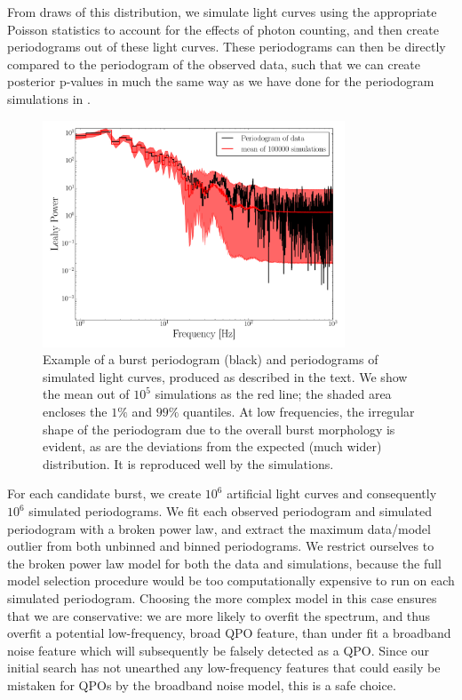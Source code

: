 \documentclass[numberedappendix]{emulateapj}
\begin{document}
From draws of this distribution, we simulate light curves using the appropriate Poisson statistics to account for the effects of photon counting, and then create periodograms out of these light curves. These periodograms can then be directly compared to the periodogram of the observed data, such that we can create posterior p-values in much the same way as we have done for the periodogram simulations in \citep{huppenkothen2013}. 

\begin{figure}[htbp]
\begin{center}
\includegraphics[width=9cm]{f7.pdf}
\caption{Example of a burst periodogram (black) and periodograms of simulated light curves, produced as described in the text. We show the mean out of $10^5$ simulations as the red line; the shaded area encloses the $1\%$ and $99\%$ quantiles. At low frequencies, the irregular shape
of the periodogram due to the overall burst morphology is evident, as are the deviations from the expected (much wider) distribution.  It is reproduced well by the simulations.}
\label{fig:burst_lcmodel_ps}
\end{center}
\end{figure}
For each candidate burst, we create $10^6$ artificial light curves and consequently $10^6$ simulated periodograms. We fit each observed periodogram and simulated periodogram with a broken power law, and extract the maximum data/model outlier from both unbinned and binned periodograms. We restrict ourselves to the broken power law model for both the data and simulations, because the full model selection procedure would be too computationally expensive to run on each simulated periodogram. Choosing the more complex model in this case ensures that we are conservative: we are more likely to overfit the spectrum, and thus overfit a potential low-frequency, broad QPO feature, than under fit a broadband noise feature which will subsequently be falsely detected as a QPO. Since our initial search has not unearthed any low-frequency features that could easily be mistaken for QPOs by the broadband noise model, this is a safe choice.
\end{document}
